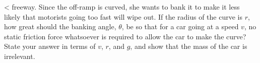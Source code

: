  <%
freeway. Since the off-ramp is curved, she wants to bank it
to make it less likely that motorists going too fast will
wipe out. If the radius of the curve is $r$, how great
should the banking angle, $\theta $, be so that for a car
going at a speed $v$, no static friction force whatsoever is
required to allow the car to make the curve? State your
answer in terms of $v$, $r$, and $g$, and show that the mass of
the car is irrelevant.
